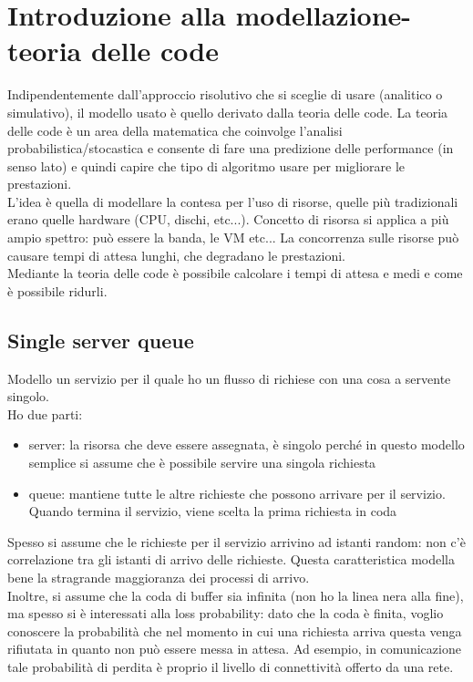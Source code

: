 \documentclass{article}
\begin{document}
\section{Introduzione alla modellazione-teoria delle code}
Indipendentemente dall'approccio risolutivo che si sceglie di usare (analitico o simulativo), il modello usato è quello derivato dalla teoria delle code. 
La teoria delle code è un area della matematica che coinvolge l'analisi probabilistica/stocastica e consente di fare una predizione delle performance (in senso lato) e quindi capire che tipo di algoritmo usare per migliorare le prestazioni.\\ L'idea è quella di modellare la contesa per l'uso di risorse, quelle più tradizionali erano quelle hardware (CPU, dischi, etc...). Concetto di risorsa si applica a più ampio spettro: può essere la banda, le VM etc... La concorrenza sulle risorse può causare tempi di attesa lunghi, che degradano le prestazioni.\\ Mediante la teoria delle code è possibile calcolare i tempi di attesa e medi e come è possibile ridurli.
\subsection{Single server queue}
Modello un servizio per il quale ho un flusso di richiese con una cosa a servente singolo.\\ 
Ho due parti:
\begin{itemize}
\item server: la risorsa che deve essere assegnata, è singolo perché in questo modello semplice si assume che è possibile servire una singola richiesta
\item queue: mantiene tutte le altre richieste che possono arrivare per il servizio. Quando termina il servizio, viene scelta la prima richiesta in coda
\end{itemize}
Spesso si assume che le richieste per il servizio arrivino ad istanti random: non c'è correlazione tra gli istanti di arrivo delle richieste. Questa caratteristica modella bene la stragrande maggioranza dei processi di arrivo.\\ Inoltre, si assume che la coda di buffer sia infinita (non ho la linea nera alla fine), ma spesso si è interessati alla loss probability: dato che la coda è finita, voglio conoscere la probabilità che nel momento in cui una richiesta arriva questa venga rifiutata in quanto non può essere messa in attesa. Ad esempio, in comunicazione tale probabilità di perdita è proprio il livello di connettività offerto da una rete.\\ 
\end{document}
